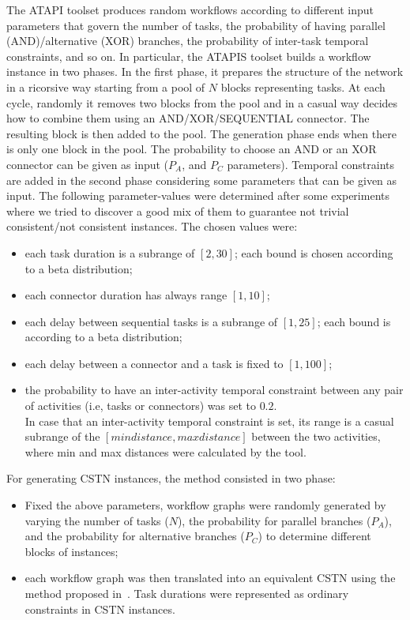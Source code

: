 \documentclass[a4paper,11pt]{article}
\begin{document}
The ATAPI toolset produces random workflows according to different input parameters that govern the number of tasks, the probability of having parallel (AND)\slash alternative (XOR) branches, the probability of inter-task temporal constraints, and so on.
In particular, the ATAPIS toolset builds a workflow instance in two phases. In the first phase, it prepares the structure of the network in a ricorsive way starting from a pool of $N$ blocks representing tasks.
At each cycle, randomly it removes two blocks from the pool and in a casual way decides how to combine them using an AND/XOR/SEQUENTIAL connector.
The resulting block is then added to the pool. The generation phase ends when there is only one block in the pool. 
The probability to choose an AND or an XOR connector can be given as input ($P_A$, and $P_C$ parameters).
Temporal constraints are added in the second phase considering some parameters that can be given as input. 
The following parameter-values were determined after some experiments where we tried to discover a good mix of them to  guarantee not trivial consistent\slash not consistent instances.
The chosen values were:
\begin{itemize}
\item each task duration is a subrange of $[2, 30]$; each bound is chosen according to a beta distribution;
\item each connector duration has always range $[1, 10]$;
\item each delay between sequential tasks is a subrange of $[1, 25]$; each bound is according to a beta distribution;
\item each delay between a connector and a task is fixed to $[1, 100]$;
\item the probability to have an inter-activity temporal constraint between any pair of activities (i.e, tasks or connectors) was set to $0.2$.\\
	In case that an inter-activity temporal constraint is set, its range is a casual subrange of the $[min distance, max distance]$ between the two activities, where min and max distances were calculated by the tool.
\end{itemize}

For generating CSTN instances, the method consisted in two phase:
\begin{itemize}
\item Fixed the above parameters, workflow graphs were randomly generated by varying the number of tasks ($N$), the probability for parallel branches ($P_A$), and the probability for alternative branches ($P_C$) to determine different blocks of instances; 
\item each workflow graph was then translated into an equivalent CSTN using the method proposed in~\cite{CombiGMP14}. Task durations were represented as ordinary constraints in CSTN instances.
\end{itemize}
\end{document}

